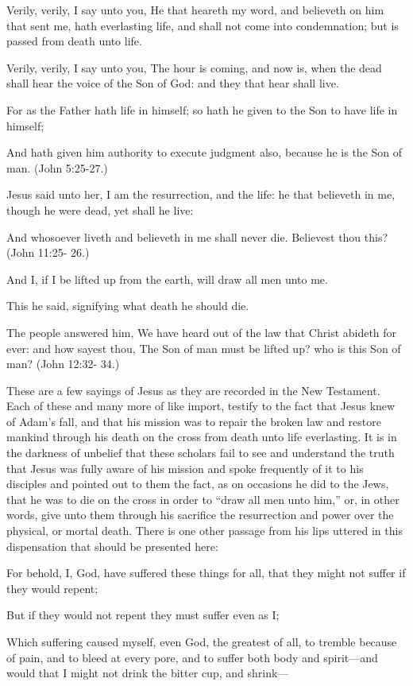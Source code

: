 Verily, verily, I say unto you, He that heareth my word, and believeth on him that sent me,
hath everlasting life, and shall not come into condemnation; but is passed from death unto
life.

Verily, verily, I say unto you, The hour is coming, and now is, when the dead shall hear the
voice of the Son of God: and they that hear shall live.

For as the Father hath life in himself; so hath he given to the Son to have life in himself;

And hath given him authority to execute judgment also, because he is the Son of man. (John
5:25-27.)

Jesus said unto her, I am the resurrection, and the life: he that believeth in me, though he
were dead, yet shall he live:

And whosoever liveth and believeth in me shall never die. Believest thou this? (John 11:25-
26.)

And I, if I be lifted up from the earth, will draw all men unto me.

This he said, signifying what death he should die.

The people answered him, We have heard out of the law that Christ abideth for ever: and
how sayest thou, The Son of man must be lifted up? who is this Son of man? (John 12:32-
34.)

These are a few sayings of Jesus as they are recorded in the New Testament. Each of these
and many more of like import, testify to the fact that Jesus knew of Adam's fall, and that his
mission was to repair the broken law and restore mankind through his death on the cross
from death unto life everlasting. It is in the darkness of unbelief that these scholars fail to see
and understand the truth that Jesus was fully aware of his mission and spoke frequently of it
to his disciples and pointed out to them the fact, as on occasions he did to the Jews, that he
was to die on the cross in order to ``draw all men unto him,'' or, in other words, give unto
them through his sacrifice the resurrection and power over the physical, or mortal death.
There is one other passage from his lips uttered in this dispensation that should be presented
here:

For behold, I, God, have suffered these things for all, that they might not suffer if they would
repent;

But if they would not repent they must suffer even as I;

Which suffering caused myself, even God, the greatest of all, to tremble because of pain, and
to bleed at every pore, and to suffer both body and spirit—and would that I might not drink
the bitter cup, and shrink—

